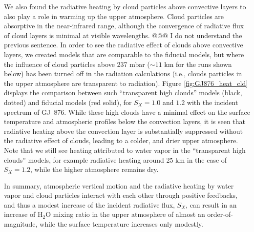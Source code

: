\documentclass[11pt,numberedappendix,twocolappendix,]{emulateapj}
\def\water{H$_2$O }
\newcommand{\dsa}[1]{{\color{blue}#1}}
\begin{document}
We also found the radiative heating by cloud particles above convective layers to also play a role in warming up the upper atmosphere. 
Cloud particles are absorptive in the near-infrared range, although the convergence of radiative flux of cloud layers is minimal at visible wavelengths. \dsa{@@@ I do not understand the previous sentence.}  
In order to see the radiative effect of clouds above convective layers, we created models that are comparable to the fiducial models, but where the  influence of cloud particles above 237 mbar ($\sim 11$ km for the runs shown below) has been turned off in the radiation calculations (i.e., clouds particles in the upper atmosphere are transparent to radiation). 
Figure \ref{fig:GJ876_heat_cld} displays the comparison between such ``transparent high clouds'' models (black, dotted) and fiducial models (red solid), for $S_X=1.0$ and $1.2$ with the incident spectrum of GJ~876. 
While these high clouds have a minimal effect on the surface temperature and atmospheric profiles below the convection layers, it is seen that radiative heating above the convection layer is substantially suppressed without the radiative effect of clouds, leading to a colder, and drier upper atmosphere. 
Note that we still see heating attributed to water vapor in the ``transparent high clouds'' models, for example radiative heating around 25 km in the case of $S_X=1.2$, while the higher atmosphere remains dry. 

In summary, atmospheric vertical motion and the radiative heating by water vapor and cloud particles interact with each other through positive feedbacks, and thus a modest increase of the incident radiative flux, $S_X$, can result in  an increase of \water mixing ratio in the upper atmosphere of almost an order-of-magnitude, while the surface temperature increases only modestly. 

\end{document}
